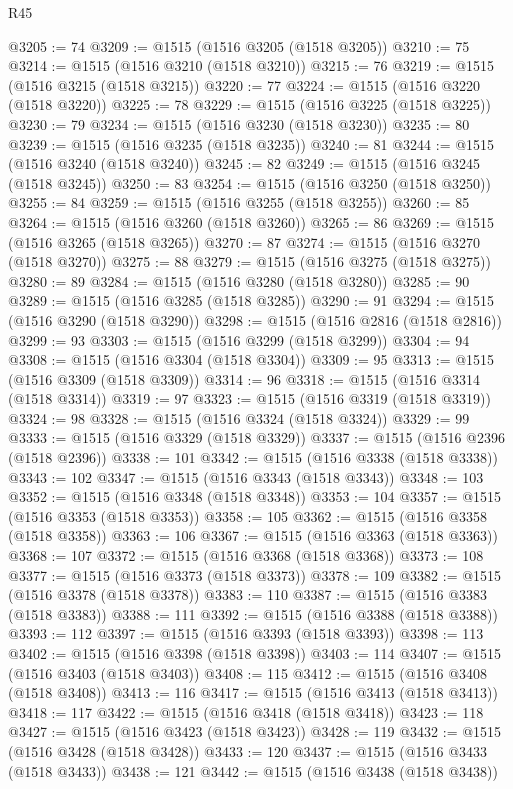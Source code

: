 \begin{lexlean}{R45}
\begin{coremodule}
{@3205 := 74
@3209 := @1515 (@1516 @3205 (@1518 @3205))
@3210 := 75
@3214 := @1515 (@1516 @3210 (@1518 @3210))
@3215 := 76
@3219 := @1515 (@1516 @3215 (@1518 @3215))
@3220 := 77
@3224 := @1515 (@1516 @3220 (@1518 @3220))
@3225 := 78
@3229 := @1515 (@1516 @3225 (@1518 @3225))
@3230 := 79
@3234 := @1515 (@1516 @3230 (@1518 @3230))
@3235 := 80
@3239 := @1515 (@1516 @3235 (@1518 @3235))
@3240 := 81
@3244 := @1515 (@1516 @3240 (@1518 @3240))
@3245 := 82
@3249 := @1515 (@1516 @3245 (@1518 @3245))
@3250 := 83
@3254 := @1515 (@1516 @3250 (@1518 @3250))
@3255 := 84
@3259 := @1515 (@1516 @3255 (@1518 @3255))
@3260 := 85
@3264 := @1515 (@1516 @3260 (@1518 @3260))
@3265 := 86
@3269 := @1515 (@1516 @3265 (@1518 @3265))
@3270 := 87
@3274 := @1515 (@1516 @3270 (@1518 @3270))
@3275 := 88
@3279 := @1515 (@1516 @3275 (@1518 @3275))
@3280 := 89
@3284 := @1515 (@1516 @3280 (@1518 @3280))
@3285 := 90
@3289 := @1515 (@1516 @3285 (@1518 @3285))
@3290 := 91
@3294 := @1515 (@1516 @3290 (@1518 @3290))
@3298 := @1515 (@1516 @2816 (@1518 @2816))
@3299 := 93
@3303 := @1515 (@1516 @3299 (@1518 @3299))
@3304 := 94
@3308 := @1515 (@1516 @3304 (@1518 @3304))
@3309 := 95
@3313 := @1515 (@1516 @3309 (@1518 @3309))
@3314 := 96
@3318 := @1515 (@1516 @3314 (@1518 @3314))
@3319 := 97
@3323 := @1515 (@1516 @3319 (@1518 @3319))
@3324 := 98
@3328 := @1515 (@1516 @3324 (@1518 @3324))
@3329 := 99
@3333 := @1515 (@1516 @3329 (@1518 @3329))
@3337 := @1515 (@1516 @2396 (@1518 @2396))
@3338 := 101
@3342 := @1515 (@1516 @3338 (@1518 @3338))
@3343 := 102
@3347 := @1515 (@1516 @3343 (@1518 @3343))
@3348 := 103
@3352 := @1515 (@1516 @3348 (@1518 @3348))
@3353 := 104
@3357 := @1515 (@1516 @3353 (@1518 @3353))
@3358 := 105
@3362 := @1515 (@1516 @3358 (@1518 @3358))
@3363 := 106
@3367 := @1515 (@1516 @3363 (@1518 @3363))
@3368 := 107
@3372 := @1515 (@1516 @3368 (@1518 @3368))
@3373 := 108
@3377 := @1515 (@1516 @3373 (@1518 @3373))
@3378 := 109
@3382 := @1515 (@1516 @3378 (@1518 @3378))
@3383 := 110
@3387 := @1515 (@1516 @3383 (@1518 @3383))
@3388 := 111
@3392 := @1515 (@1516 @3388 (@1518 @3388))
@3393 := 112
@3397 := @1515 (@1516 @3393 (@1518 @3393))
@3398 := 113
@3402 := @1515 (@1516 @3398 (@1518 @3398))
@3403 := 114
@3407 := @1515 (@1516 @3403 (@1518 @3403))
@3408 := 115
@3412 := @1515 (@1516 @3408 (@1518 @3408))
@3413 := 116
@3417 := @1515 (@1516 @3413 (@1518 @3413))
@3418 := 117
@3422 := @1515 (@1516 @3418 (@1518 @3418))
@3423 := 118
@3427 := @1515 (@1516 @3423 (@1518 @3423))
@3428 := 119
@3432 := @1515 (@1516 @3428 (@1518 @3428))
@3433 := 120
@3437 := @1515 (@1516 @3433 (@1518 @3433))
@3438 := 121
@3442 := @1515 (@1516 @3438 (@1518 @3438))
}
\end{coremodule}
\end{lexlean}
